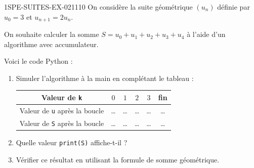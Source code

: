 \begin{exercice}{1SPE-SUITES-EX-021}{1}{10}
On considère la suite géométrique $(u_n)$ définie par $u_0 = 3$ et $u_{n+1} = 2u_n$.

On souhaite calculer la somme $S = u_0 + u_1 + u_2 + u_3 + u_4$ à l'aide d'un algorithme avec accumulateur.

Voici le code Python :



\begin{enumerate}
  \item Simuler l'algorithme à la main en complétant le tableau :

  \medskip
  \begin{tabular}{|c|c|c|c|c|c|}
    \hline
    Valeur de \texttt{k} & $0$ & $1$ & $2$ & $3$ & fin \\
    \hline
    Valeur de \texttt{u} après la boucle & \dots & \dots & \dots & \dots & \dots \\
    \hline
    Valeur de \texttt{S} après la boucle & \dots & \dots & \dots & \dots & \dots \\
    \hline
  \end{tabular}
  \medskip

  \item Quelle valeur \texttt{print(S)} affiche-t-il ?
  \item Vérifier ce résultat en utilisant la formule de somme géométrique.
\end{enumerate}
\end{exercice}
